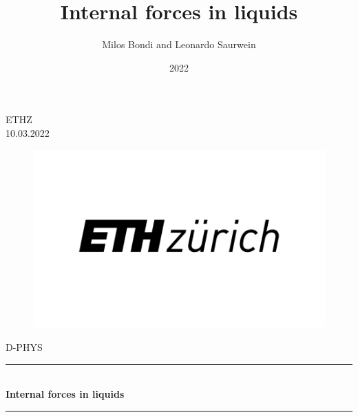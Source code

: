 \documentclass{article}
\begin{document}
\renewcommand{\contentsname}{Indice}

\newcommand{\createEquation}[1]{
	\vspace{0.5cm} 
	\begin{equation}
		{#1}
	\end{equation}
	\vspace{0.5cm}
}


\title{Internal forces in liquids}
\author{Milos Bondi and Leonardo Saurwein}
\date{2022}

\newcommand\blankpage{
\null
\thispagestyle{empty}
\addtocounter{page}{-1}
\newpage
}

\newcommand{\Hrule}{\rule{\linewidth}{0.5mm}}

\begin{titlepage} %
		\center
		\textsc{\LARGE ETHZ} \\[0.7cm] %
		{\large 10.03.2022} \\[1cm]
		\begin{figure}
		    \centering
		    \includegraphics[scale=0.2]{logo_ethz.png}
		\end{figure}
		
		\textsc{\Large D-PHYS} \\ [0.5cm]%
		
		\Hrule \\ [0.4cm]
		{\huge \bfseries Internal forces in liquids} \\[0.4cm] %
		\Hrule \\[0.4cm]
		

\end{titlepage}
\end{document}
